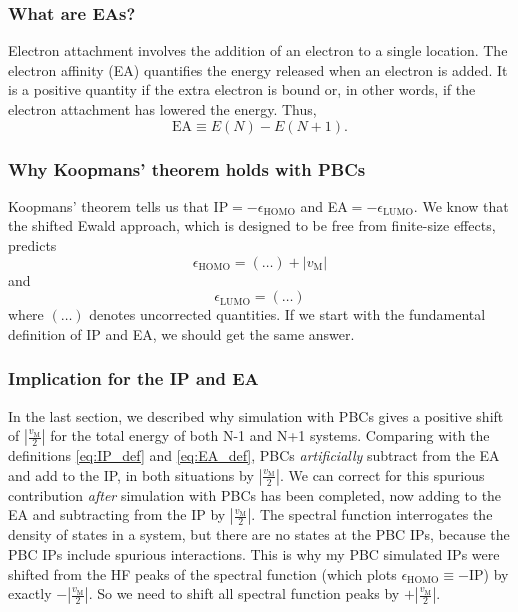 \subsubsection{What are EAs?}
Electron attachment involves the addition of an electron to a single location. The electron affinity (EA) quantifies the energy released when an electron is added. It is a positive quantity if the extra electron is bound or, in other words, if the electron attachment has lowered the energy. Thus,
\begin{equation}
    \text{EA} \equiv E(N) - E(N+1).
\label{eq:EA_def}
\end{equation}
\subsubsection{Why Koopmans' theorem holds with PBCs}
Koopmans' theorem tells us that IP$=-\epsilon_{\text{HOMO}}$ and EA$=-\epsilon_{\text{LUMO}}$. We know that the shifted Ewald approach, which is designed to be free from finite-size effects, predicts
\begin{equation}
    \epsilon_{\text{HOMO}} = (\ldots) + |v_{\mathrm{M}}|
\end{equation}
and
\begin{equation}
    \epsilon_{\text{LUMO}} = (\ldots)
\end{equation}
where $(\ldots)$ denotes uncorrected quantities. If we start with the fundamental definition of IP and EA, we should get the same answer.
\subsubsection{Implication for the IP and EA}
In the last section, we described why simulation with PBCs gives a positive shift of $|\frac{v_{\mathrm{M}}}{2}|$ for the total energy of both N-1 and N+1 systems. Comparing with the definitions \ref{eq:IP_def} and \ref{eq:EA_def}, PBCs \emph{artificially} subtract from the EA and add to the IP, in both situations by $|\frac{v_{\mathrm{M}}}{2}|$. We can correct for this spurious contribution \emph{after} simulation with PBCs has been completed, now adding to the EA and subtracting from the IP by $|\frac{v_{\mathrm{M}}}{2}|$. %
The spectral function interrogates the density of states in a system, but there are no states at the PBC IPs, because the PBC IPs include spurious interactions.  This is why my PBC simulated IPs were shifted from the HF peaks of the spectral function (which plots $\epsilon_{\text{HOMO}}\equiv -\text{IP}$) by exactly $-|\frac{v_{\mathrm{M}}}{2}|$. So we need to shift all spectral function peaks by $+|\frac{v_{\mathrm{M}}}{2}|$.
